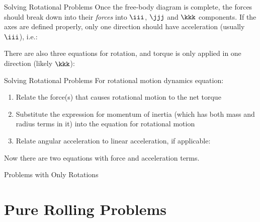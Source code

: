 \documentclass[12pt,compress,aspectratio=169]{beamer}
\begin{document}
\begin{frame}{Solving Rotational Problems}
  Once the free-body diagram is complete, the forces should break down into
  their \emph{forces} into $\iii$, $\jjj$ and $\kkk$ components. If the axes
  are defined properly, only one direction should have acceleration (usually
  $\iii$), i.e.:
  

  There are also three equations for rotation, and torque is only applied in one
  direction (likely $\kkk$):
    
\end{frame}



\begin{frame}{Solving Rotational Problems}
  For rotational motion dynamics equation:
  \begin{enumerate}
  \item Relate the force(s) that causes rotational motion to the net torque

  \item Substitute the expression for momentum of inertia (which has both mass
    and radius terms in it) into the equation for rotational motion
  \item Relate angular acceleration to linear acceleration, if applicable:

  \end{enumerate}
  Now there are two equations with force and acceleration terms.
\end{frame}


\begin{frame}{Problems with Only Rotations}


\end{frame}



\section{Pure Rolling Problems}
\end{document}
